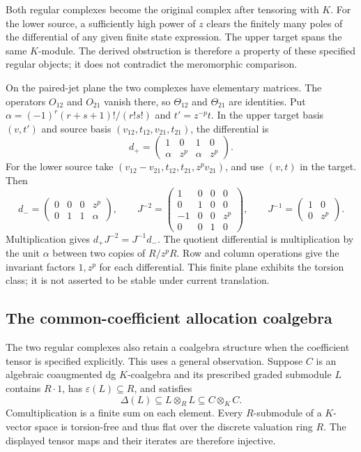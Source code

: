 Both regular complexes become the original complex after tensoring
with \(K\).  For the lower source, a sufficiently high power of
\(z\) clears the finitely many poles of the differential of any
given finite state expression.  The upper target spans the same
\(K\)-module.  The derived obstruction is therefore a property of
these specified regular objects; it does not contradict the
meromorphic comparison.

On the paired-jet plane the two complexes have elementary matrices.
The operators \(O_{12}\) and \(O_{21}\) vanish there, so
\(\Theta_{12}\) and \(\Theta_{21}\) are identities.  Put
\(\alpha=(-1)^r(r+s+1)!/(r!s!)\) and \(t'=z^{-p}t\).
In the upper target basis \((v,t')\) and source basis
\((v_{12},t_{12},v_{21},t_{21})\), the differential is
\[
 d_+=\begin{pmatrix}1&0&1&0\\
                    \alpha&z^p&\alpha&z^p\end{pmatrix}.
\]
For the lower source take
\((v_{12}-v_{21},t_{12},t_{21},z^pv_{21})\), and use \((v,t)\)
in the target.  Then
\[
 d_-=\begin{pmatrix}0&0&0&z^p\\0&1&1&\alpha\end{pmatrix},
 \qquad
 J^{-2}=\begin{pmatrix}
  1&0&0&0\\0&1&0&0\\-1&0&0&z^p\\0&0&1&0
 \end{pmatrix},\qquad
 J^{-1}=\begin{pmatrix}1&0\\0&z^p\end{pmatrix}.
\]
Multiplication gives \(d_+J^{-2}=J^{-1}d_-\).
The quotient differential is multiplication by the unit \(\alpha\)
between two copies of \(R/z^pR\).  Row and column operations give
the invariant factors \(1,z^p\) for each differential.
This finite plane exhibits the torsion class; it is not asserted to
be stable under current translation.

\subsection{The common-coefficient allocation coalgebra}

The two regular complexes also retain a coalgebra structure when the
coefficient tensor is specified explicitly.  This uses a general
observation.  Suppose \(C\) is an algebraic coaugmented dg
\(K\)-coalgebra and its prescribed graded submodule \(L\) contains
\(R\cdot1\), has \(\varepsilon(L)\subseteq R\), and satisfies
\[
 \Delta(L)\subseteq L\otimes_RL
                 \subseteq C\otimes_KC.
\]
Comultiplication is a finite sum on each element.  Every
\(R\)-submodule of a \(K\)-vector space is torsion-free and thus
flat over the discrete valuation ring \(R\).  The displayed tensor
maps and their iterates are therefore injective.

